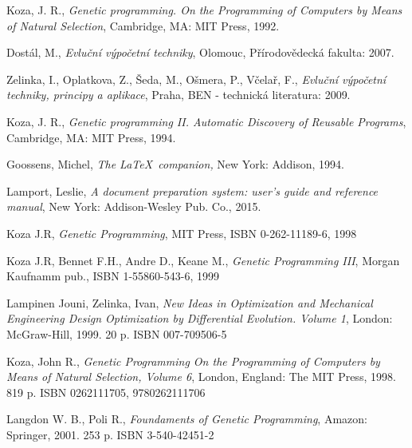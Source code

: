 \documentclass[bc,male,java,dept460]{diploma}		%
\begin{document}
\begin{thebibliography}{99}

 Koza, J. R.,
\textit{Genetic programming. On the Programming of Computers by Means of Natural Selection},
Cambridge, MA: MIT Press, 1992.

 Dostál, M.,
\textit{Evluční výpočetní techniky},
Olomouc, Přírodovědecká fakulta: 2007.

 Zelinka, I., Oplatkova, Z., Šeda, M., Ošmera, P., Včelař, F.,
\textit{Evluční výpočetní techniky, principy a aplikace},
Praha, BEN - technická literatura: 2009.

 Koza, J. R.,
\textit{Genetic programming II. Automatic Discovery of Reusable Programs},
Cambridge, MA: MIT Press, 1994.

 Goossens, Michel,
\textit{The \LaTeX\ companion,} New York: Addison, 1994.

 Lamport, Leslie,
\textit{A document preparation system: user's guide and reference manual},
New York: Addison-Wesley Pub. Co., 2015.

 Koza J.R, 
\textit{Genetic Programming},
MIT Press, ISBN 0-262-11189-6, 1998

 Koza J.R, Bennet F.H., Andre D., Keane M.,
\textit{Genetic Programming III},
Morgan Kaufnamm pub., ISBN 1-55860-543-6, 1999

 Lampinen Jouni, Zelinka, Ivan,
\textit{New Ideas in Optimization and Mechanical Engineering Design Optimization by Differential Evolution. Volume 1},
London: McGraw-Hill, 1999. 20 p. ISBN 007-709506-5

 Koza, John R.,
\textit{Genetic Programming On the Programming of Computers by Means of Natural Selection, Volume 6},
London, England: The MIT Press, 1998. 819 p. ISBN 0262111705, 9780262111706

 Langdon W. B., Poli R.,
\textit{Foundaments of Genetic Programming},
Amazon: Springer, 2001. 253 p. ISBN 3-540-42451-2

\end{thebibliography}
\end{document}
